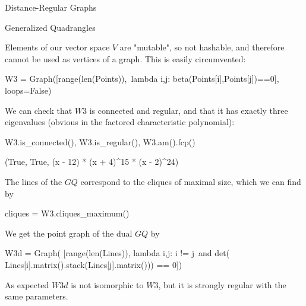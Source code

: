 \begin{chap}{Distance-Regular Graphs}
\begin{sect}{Generalized Quadrangles}
\begin{sagecode}
\begin{sageinput}
\end{sageinput}
\end{sagecode}
%
\begin{para}
Elements of our vector space $V$ are "mutable", so not hashable, 
and therefore cannot be used as vertices of a graph. This is easily circumvented:
\end{para}
%
\begin{sagecode}
\begin{sageinput}
W3 = Graph([range(len(Points)),\
   lambda i,j: beta(Points[i],Points[j])==0], loops=False)
\end{sageinput}
\end{sagecode}
%
\begin{para}
We can check that $W3$ is connected and regular, and that it has exactly three
eigenvalues (obvious in the factored characteristic polynomial):
\end{para}
%
\begin{sagecode}
\begin{sageinput}
W3.is_connected(), W3.is_regular(), W3.am().fcp()
\end{sageinput}
\begin{sageoutput}
(True, True, (x - 12) * (x + 4)^15 * (x - 2)^24)
\end{sageoutput}
\end{sagecode}
%
\begin{para}
The lines of the $GQ$ correspond to the cliques of maximal size, which we
can find by
\end{para}
%
\begin{sagecode}
\begin{sageinput}
cliques = W3.cliques_maximum()
\end{sageinput}
\end{sagecode}
%
\begin{para}
We get the point graph of the dual $GQ$ by
\end{para}
%
\begin{sagecode}
\begin{sageinput}
W3d = Graph( [range(len(Lines)), lambda i,j: i != j\
    and det( Lines[i].matrix().stack(Lines[j].matrix())) == 0])
\end{sageinput}
\end{sagecode}
%
\begin{para}
As expected $W3d$ is not isomorphic to $W3$, but it is strongly regular with
the same parameters.
\end{para}
%
\begin{sagecode}
\begin{sageinput}

\end{sageinput}
\end{sagecode}
\end{sect}
\end{chap}
